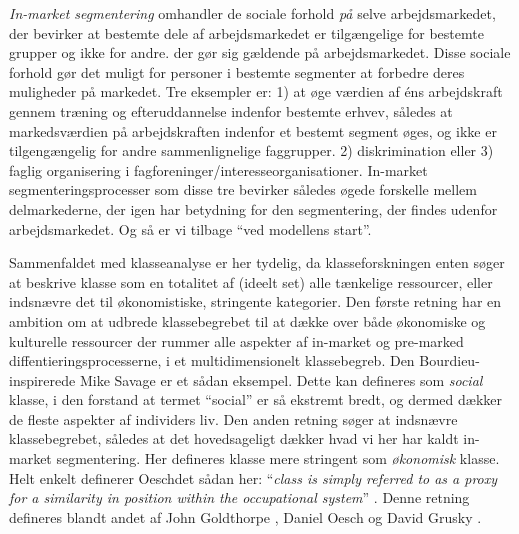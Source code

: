 \emph{In-market segmentering} omhandler de sociale forhold \emph{på} selve arbejdsmarkedet, der bevirker at bestemte dele af arbejdsmarkedet er tilgængelige for bestemte grupper og ikke for andre.  
der gør sig gældende på arbejdsmarkedet. Disse sociale forhold gør det muligt for personer i bestemte segmenter at forbedre deres muligheder på markedet. Tre eksempler er: 1) at øge værdien af éns arbejdskraft gennem træning og efteruddannelse indenfor bestemte erhvev, således at markedsværdien på arbejdskraften indenfor et bestemt segment øges, og ikke er tilgengængelig for andre sammenlignelige faggrupper.  
2) diskrimination eller 3) faglig organisering i fagforeninger/interesseorganisationer.  
In-market segmenteringsprocesser som disse tre bevirker således øgede forskelle mellem delmarkederne, der igen har betydning for den segmentering, der findes udenfor arbejdsmarkedet. Og så er vi tilbage “ved modellens start”.  

Sammenfaldet med klasseanalyse er her tydelig, da klasseforskningen enten søger at beskrive klasse som en totalitet af (ideelt set) alle tænkelige ressourcer, eller indsnævre det til økonomistiske, stringente kategorier. 
Den første retning har en ambition om at udbrede klassebegrebet til at dække over både økonomiske og kulturelle ressourcer der rummer alle aspekter af in-market og pre-marked diffentieringsprocesserne, i et multidimensionelt klassebegreb. Den Bourdieu-inspirerede Mike Savage \citeyear{Savage2015} er et sådan eksempel. Dette kan defineres som \emph{social} klasse, i den forstand at termet “social” er så ekstremt bredt, og dermed dækker de fleste aspekter af individers liv.  %
Den anden retning søger at indsnævre klassebegrebet, således at det hovedsageligt dækker hvad vi her har kaldt in-market segmentering. Her defineres klasse mere stringent som \emph{økonomisk} klasse. Helt enkelt definerer Oeschdet sådan her: “\emph{class is simply referred to as a proxy for a similarity in position within the occupational system}” \parencite[13]{Oesch2006a}. \label{class as similarity in position} %
Denne retning defineres blandt andet af John Goldthorpe \citeyear{GoldthorpeMcKnight2004}, Daniel Oesch \citeyear{Oesch2006a} og David Grusky \citeyear{Grusky2001}. 

